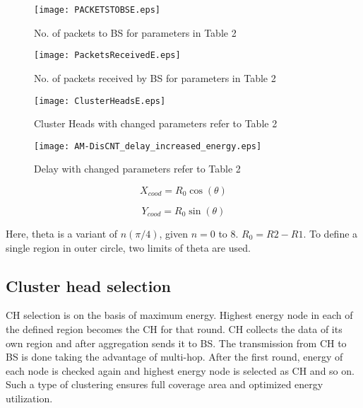 \documentclass[journal]{IEEEtran}
\begin{document}
\begin{figure}[ht]
\begin{center}
\texttt{[image: PACKETSTOBSE.eps]}
\vspace{-0.7cm}
\caption{No. of packets to BS for parameters in Table 2}
\end{center}
\end{figure}

\begin{figure}[ht]
\begin{center}
\texttt{[image: PacketsReceivedE.eps]}
\vspace{-0.7cm}
\caption{No. of packets received by BS for parameters in Table 2}
\end{center}
\end{figure}

\begin{figure}[ht]
\begin{center}
\texttt{[image: ClusterHeadsE.eps]}
\vspace{-0.7cm}
\caption{Cluster Heads with changed parameters refer to Table 2}
\end{center}
\end{figure}

\begin{figure}[ht]
\begin{center}
\texttt{[image: AM-DisCNT\_delay\_increased\_energy.eps]}
\vspace{-0.7cm}
\caption{Delay with changed parameters refer to Table 2}
\end{center}
\end{figure}

 \begin{equation}
 X_{cood} = R_{0}\cos(\theta)
 \end{equation}

  \begin{equation}
 Y_{cood} = R_{0}\sin(\theta)
 \end{equation}

 Here, theta is a variant of $n(\pi/4)$, given $n=0$ to 8. $R_{0}= R2-R1$.
 To define a single region in outer circle, two limits of theta are used.

\subsection{Cluster head selection}
 CH selection is on the basis of maximum energy. Highest energy node in each of the defined region becomes the CH for that round. CH collects the data of its own region and after aggregation sends it to BS. The transmission from CH to BS is done taking the advantage of multi-hop. After the first round, energy of each node is checked again and highest energy node is selected as CH and so on. Such a type of clustering ensures full coverage area and optimized energy utilization.
\end{document}
